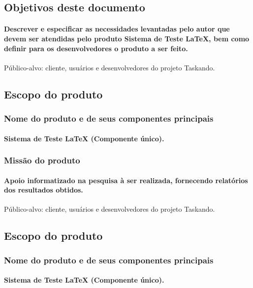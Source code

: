 	\subsection{Objetivos deste documento}
		\paragraph{Descrever e especificar as necessidades levantadas pelo autor que devem ser atendidas pelo produto Sistema de Teste LaTeX, bem como definir para os desenvolvedores o produto a ser feito.}
\paragraph{}Público-alvo: cliente, usuários e desenvolvedores do projeto Taskando.
	\subsection{Escopo do produto}
		\subsubsection{Nome do produto e de seus componentes principais}
			\paragraph{Sistema de Teste LaTeX (Componente único). }
		\subsubsection{Missão do produto}
			\paragraph{Apoio informatizado na pesquisa à ser realizada, fornecendo relatórios dos resultados obtidos.}
			\paragraph{}Público-alvo: cliente, usuários e desenvolvedores do projeto Taskando.
	\subsection{Escopo do produto}
		\subsubsection{Nome do produto e de seus componentes principais}
			\paragraph{Sistema de Teste LaTeX (Componente único). }
